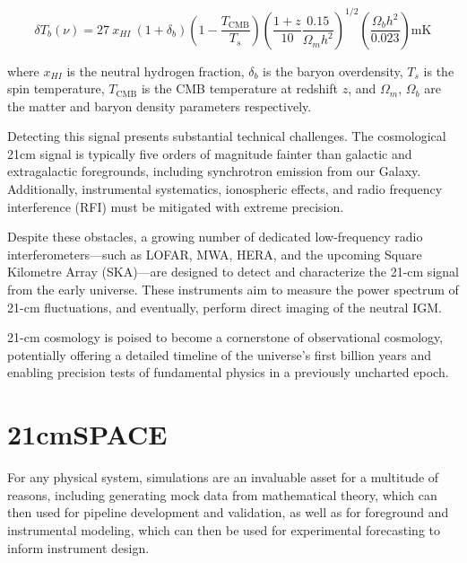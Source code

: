 \documentclass[floats,floatfix,showpacs,amssymb,prd,superscriptaddress,nofootinbib]{revtex4-2} %
\begin{document}
\begin{equation}
    \delta T_b (\nu) = 27 \ x_{HI} \ (1 + \delta_b) \left(1 - \frac{T_{\text{CMB}}}{T_s} \right) \left(\frac{1 + z}{10} \frac{0.15}{\Omega_m h^2} \right)^{1/2} \left( \frac{\Omega_b h^2}{0.023} \right) \text{mK}
    \label{eq:brightness_temperature}
\end{equation}

\noindent where $x_{HI}$ is the neutral hydrogen fraction, $\delta_b$ is the baryon overdensity, $T_s$ is the spin temperature, $T_{\text{CMB}}$ is the CMB temperature at redshift $z$, and $\Omega_m$, $\Omega_b$ are the matter and baryon density parameters respectively.

Detecting this signal presents substantial technical challenges. The cosmological 21cm signal is typically five orders of magnitude fainter than galactic and extragalactic foregrounds, including synchrotron emission from our Galaxy. Additionally, instrumental systematics, ionospheric effects, and radio frequency interference (RFI) must be mitigated with extreme precision.

Despite these obstacles, a growing number of dedicated low-frequency radio interferometers—such as LOFAR, MWA, HERA, and the upcoming Square Kilometre Array (SKA)—are designed to detect and characterize the 21-cm signal from the early universe. These instruments aim to measure the power spectrum of 21-cm fluctuations, and eventually, perform direct imaging of the neutral IGM.

21-cm cosmology is poised to become a cornerstone of observational cosmology, potentially offering a detailed timeline of the universe's first billion years and enabling precision tests of fundamental physics in a previously uncharted epoch.

\section{21cmSPACE}
For any physical system, simulations are an invaluable asset for a multitude of reasons, including generating mock data from mathematical theory, which can then used for pipeline development and validation, as well as for foreground and instrumental modeling, which can then be used for experimental forecasting to inform instrument design. 
\end{document}
